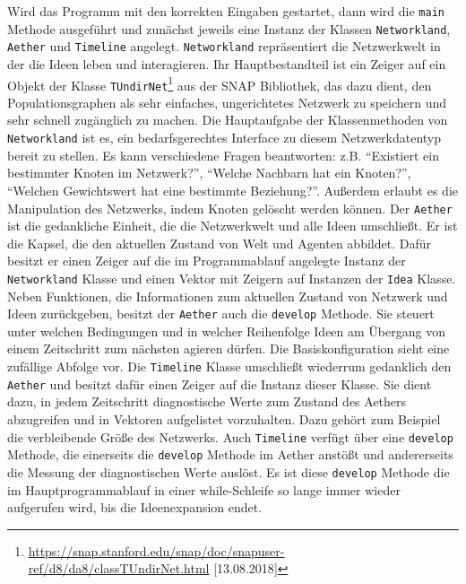 \documentclass[openany,twoside,twocolumn]{book}
\let\rmarkdownfootnote\footnote%
\def\footnote{\protect\rmarkdownfootnote}
\begin{document}
Wird das Programm mit den korrekten Eingaben gestartet, dann wird die
\texttt{main} Methode ausgeführt und zunächst jeweils eine Instanz der
Klassen \texttt{Networkland}, \texttt{Aether} und \texttt{Timeline}
angelegt. \texttt{Networkland} repräsentiert die Netzwerkwelt in der die
Ideen leben und interagieren. Ihr Hauptbestandteil ist ein Zeiger auf
ein Objekt der Klasse \texttt{TUndirNet}\footnote{\url{https://snap.stanford.edu/snap/doc/snapuser-ref/d8/da8/classTUndirNet.html}
  {[}13.08.2018{]}} aus der SNAP Bibliothek, das dazu dient, den
Populationsgraphen als sehr einfaches, ungerichtetes Netzwerk zu
speichern und sehr schnell zugänglich zu machen. Die Hauptaufgabe der
Klassenmethoden von \texttt{Networkland} ist es, ein bedarfsgerechtes
Interface zu diesem Netzwerkdatentyp bereit zu stellen. Es kann
verschiedene Fragen beantworten: z.B. ``Existiert ein bestimmter Knoten
im Netzwerk?'', ``Welche Nachbarn hat ein Knoten?'', ``Welchen
Gewichtswert hat eine bestimmte Beziehung?''. Außerdem erlaubt es die
Manipulation des Netzwerks, indem Knoten gelöscht werden können. Der
\texttt{Aether} ist die gedankliche Einheit, die die Netzwerkwelt und
alle Ideen umschließt. Er ist die Kapsel, die den aktuellen Zustand von
Welt und Agenten abbildet. Dafür besitzt er einen Zeiger auf die im
Programmablauf angelegte Instanz der \texttt{Networkland} Klasse und
einen Vektor mit Zeigern auf Instanzen der \texttt{Idea} Klasse. Neben
Funktionen, die Informationen zum aktuellen Zustand von Netzwerk und
Ideen zurückgeben, besitzt der \texttt{Aether} auch die \texttt{develop}
Methode. Sie steuert unter welchen Bedingungen und in welcher
Reihenfolge Ideen am Übergang von einem Zeitschritt zum nächsten agieren
dürfen. Die Basiskonfiguration sieht eine zufällige Abfolge vor. Die
\texttt{Timeline} Klasse umschließt wiederrum gedanklich den
\texttt{Aether} und besitzt dafür einen Zeiger auf die Instanz dieser
Klasse. Sie dient dazu, in jedem Zeitschritt diagnostische Werte zum
Zustand des Aethers abzugreifen und in Vektoren aufgelistet vorzuhalten.
Dazu gehört zum Beispiel die verbleibende Größe des Netzwerks. Auch
\texttt{Timeline} verfügt über eine \texttt{develop} Methode, die
einerseits die \texttt{develop} Methode im Aether anstößt und
andererseits die Messung der diagnostischen Werte auslöst. Es ist diese
\texttt{develop} Methode die im Hauptprogrammablauf in einer
while-Schleife so lange immer wieder aufgerufen wird, bis die
Ideenexpansion endet.
\end{document}
